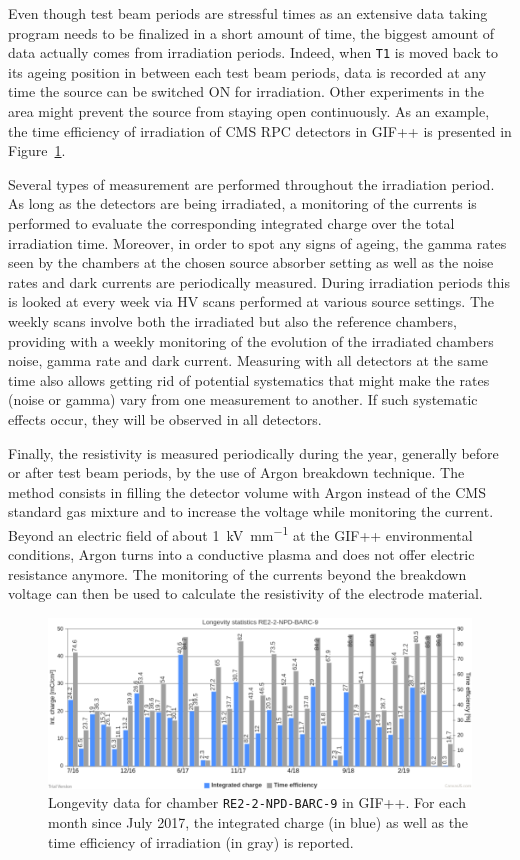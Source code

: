 	Even though test beam periods are stressful times as an extensive data taking program needs to be finalized in a short amount of time, the biggest amount of data actually comes from irradiation periods. Indeed, when \texttt{T1} is moved back to its ageing position in between each test beam periods, data is recorded at any time the source can be switched ON for irradiation. Other experiments in the area might prevent the source from staying open continuously. As an example, the time efficiency of irradiation of CMS RPC detectors in GIF++ is presented in Figure~\ref{fig:Irr-stat}.
	
	Several types of measurement are performed throughout the irradiation period. As long as the detectors are being irradiated, a monitoring of the currents is performed to evaluate the corresponding integrated charge over the total irradiation time. Moreover, in order to spot any signs of ageing, the gamma rates seen by the chambers at the chosen source absorber setting as well as the noise rates and dark currents are periodically measured. During irradiation periods this is looked at every week via HV scans performed at various source settings. The weekly scans involve both the irradiated but also the reference chambers, providing with a weekly monitoring of the evolution of the irradiated chambers noise, gamma rate and dark current. Measuring with all detectors at the same time also allows getting rid of potential systematics that might make the rates (noise or gamma) vary from one measurement to another. If such systematic effects occur, they will be observed in all detectors.
	
	Finally, the resistivity is measured periodically during the year, generally before or after test beam periods, by the use of Argon breakdown technique. The method consists in filling the detector volume with Argon instead of the CMS standard gas mixture and to increase the voltage while monitoring the current. Beyond an electric field of about \SI{1}{kV.mm^{-1}} at the GIF++ environmental conditions, Argon turns into a conductive plasma and does not offer electric resistance anymore. The monitoring of the currents beyond the breakdown voltage can then be used to calculate the resistivity of the electrode material.

	\begin{figure}[H]
        \centering
		\includegraphics[width = \linewidth]{fig/chapt5/GIFpp-irradiation-statistics.png}
		\caption{\label{fig:Irr-stat} Longevity data for chamber \texttt{RE2-2-NPD-BARC-9} in GIF++. For each month since July 2017, the integrated charge (in blue) as well as the time efficiency of irradiation (in gray) is reported.}
	\end{figure}
	

